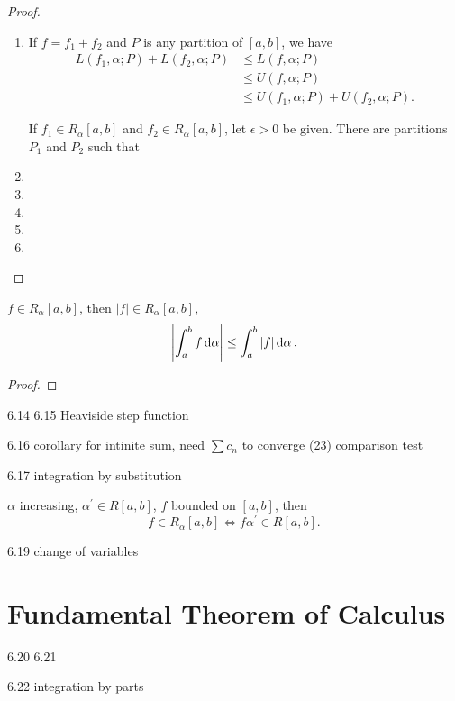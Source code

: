 \begin{proof} \
\begin{enumerate}[label=(\arabic*)]
\item If $f=f_1+f_2$ and $P$ is any partition of $[a,b]$, we have
\begin{align*}
L(f_1,\alpha;P)+L(f_2,\alpha;P)&\le L(f,\alpha;P)\\
&\le U(f,\alpha;P)\\
&\le U(f_1,\alpha;P)+U(f_2,\alpha;P).
\end{align*}

If $f_1\in R_\alpha[a,b]$ and $f_2\in R_\alpha[a,b]$, let $\epsilon>0$ be given. There are partitions $P_1$ and $P_2$ such that


\item 
\item 
\item 
\item 
\item 
\end{enumerate}
\end{proof}

\begin{theorem}
$f\in R_\alpha[a,b]$, then $|f|\in R_\alpha[a,b]$,
\[ \left|\int_a^bf\dd{\alpha}\right|\le\int_a^b|f|\dd{\alpha}. \]
\end{theorem}

\begin{proof}

\end{proof}

6.14 6.15
Heaviside step function

6.16 corollary
for intinite sum, need $\sum c_n$ to converge
(23) comparison test

6.17 integration by substitution
\begin{theorem}
$\alpha$ increasing, $\alpha^\prime\in R[a,b]$, $f$ bounded on $[a,b]$, then
\[ f\in R_\alpha[a,b]\iff f\alpha^\prime\in R[a,b]. \]
\end{theorem}

6.19 change of variables

\section{Fundamental Theorem of Calculus}
6.20 6.21

\begin{theorem}

\end{theorem}

6.22 integration by parts